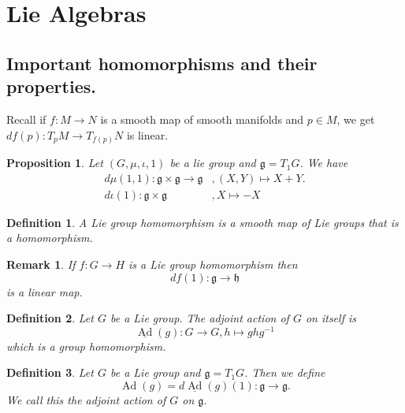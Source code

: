 \documentclass{article}
\newtheorem{proposition}{Proposition}[section]
\newtheorem{definition}{Definition}[section]
\newtheorem{remark}{Remark}[section]
\numberwithin{equation}{section}
\DeclareMathOperator{\Ad}{Ad}
\begin{document}
\section{Lie Algebras}

\subsection{Important homomorphisms and their properties.}

Recall if $f:M\to N$ is a smooth map of smooth manifolds and $p\in M$, we get $df(p):T_pM\to T_{f(p)}N$ is linear. 

\begin{proposition}
Let $(G,\mu,\iota,1)$ be a lie group and $\mathfrak{g}=T_1G$. We have
\begin{align*}
d\mu(1,1):\mathfrak{g}\times\mathfrak{g}\to\mathfrak{g}&, (X,Y)\mapsto X+Y.\\
d\iota(1):\mathfrak{g}\times\mathfrak{g}&, X\mapsto -X
\end{align*}
\end{proposition}

\begin{definition}
A Lie group homomorphism is a smooth map of Lie groups that is a homomorphism.
\end{definition}

\begin{remark}
If $f:G\to H$ is a Lie group homomorphism then 
\begin{equation*}
df(1):\mathfrak{g}\to \mathfrak{h}
\end{equation*}
is a linear map.
\end{remark}

\begin{definition}
Let $G$ be a Lie group. The adjoint action of $G$ on itself is 
\begin{equation*}
\underline{\Ad}(g):G\to G, h\mapsto ghg^{-1}
\end{equation*}
which is a group homomorphism.
\end{definition}

\begin{definition}
Let $G$ be a Lie group and $\mathfrak{g} = T_1G$. Then we define
\begin{equation*}
\Ad(g) = d\underline{\Ad}(g)(1):\mathfrak{g}\to\mathfrak{g}.
\end{equation*}
We call this the adjoint action of $G$ on $\mathfrak{g}$.
\end{definition}
\end{document}
